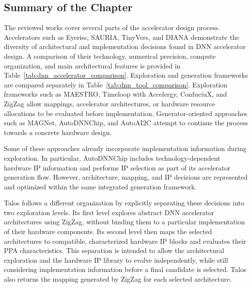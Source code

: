 \subsection{Summary of the Chapter}

The reviewed works cover several parts of the accelerator design
process. Accelerators such as Eyeriss, SAURIA, TinyVers, and DIANA
demonstrate the diversity of architectural and implementation
decisions found in DNN accelerator design. A comparison of their
technology, numerical precision, compute organization, and main
architectural features is provided in
Table~\ref{tab:dnn_accelerator_comparison}. Exploration and
generation frameworks are compared separately in
Table~\ref{tab:dnn_tool_comparison}.
Exploration frameworks such as MAESTRO, Timeloop with Accelergy,
ConfuciuX, and ZigZag allow mappings, accelerator architectures, or
hardware resource allocations to be evaluated before implementation.
Generator-oriented approaches such as MAGNet, AutoDNNChip, and
AutoAI2C attempt to continue the process towards a concrete hardware
design.

Some of these approaches already incorporate implementation
information during exploration. In particular, AutoDNNChip includes
technology-dependent hardware IP information and performs IP
selection as part of its accelerator generation flow. However,
architecture, mapping, and IP decisions are represented and optimized
within the same integrated generation framework.

Talos follows a different organization by explicitly separating these
decisions into two exploration levels. Its first level explores
abstract DNN accelerator architectures using ZigZag, without binding
them to a particular implementation of their hardware components.
Its second level then maps the selected architectures to compatible,
characterized hardware IP blocks and evaluates their PPA
characteristics. This separation is intended to allow the
architectural exploration and the hardware IP library to evolve
independently, while still considering implementation information
before a final candidate is selected. Talos also returns the mapping
generated by ZigZag for each selected architecture.

